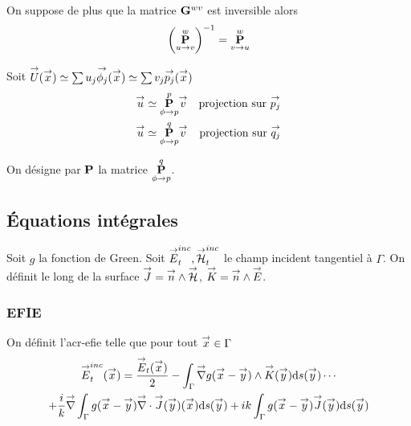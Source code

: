     \begin{prop}
      On suppose de plus que la matrice \(\mG{w}{v}\) est inversible alors
      \begin{equation}
        \left(\mP{u}{v}{w}\right)^{-1} = \mP{v}{u}{w}
      \end{equation}
    \end{prop}

    \begin{prop}
      Soit \(\vect{U}(\vx) \simeq \sum u_j \phij(\vx) \simeq \sum v_j \pj(\vx)\)
      \begin{align}
        \vect{u} & \simeq \mP{\phi}{p}{p} \vect{v} & \text{projection sur } \pj \\
        \vect{u} & \simeq \mP{\phi}{p}{q} \vect{v} & \text{projection sur } \qj
      \end{align}
    \end{prop}

    \begin{defn}
      On désigne par \(\mPP\) la matrice \(\mP{\phi}{p}{q}\).
    \end{defn}



  \subsection{Équations intégrales}

    Soit \(g\) la fonction de Green. Soit \(\vE^{inc}_t,\vH^{inc}_t\) le champ incident tangentiel à \(\Gamma\). On définit le long de la surface \(\vJ = \vn \pvect \vH\), \(\vK = \vn \pvect \vE\).

    \subsubsection{EFIE}

      \begin{defn}
        On définit l'\gls{acr-efie} telle que pour tout \(\vx \in \Gamma\)
        \begin{multline}
          \label{eq:form_int:EFIE}
          \vE^{inc}_t(\vx) =
            \frac{\vE_t(\vx)}{2}
              - \int_\Gamma \vgrad g(\vx - \vy) \pvect \vK(\vy) \dd{s}(\vy) \cdots \\
            + \frac{i}{k}\vgrad \int_\Gamma  g(\vx - \vy)\vdiv\vJ(\vy)(\vx) \dd{s}(\vy)
              +  ik\int_\Gamma g(\vx - \vy)\vJ(\vy) \dd{s}(\vy)
        \end{multline}
      \end{defn}

